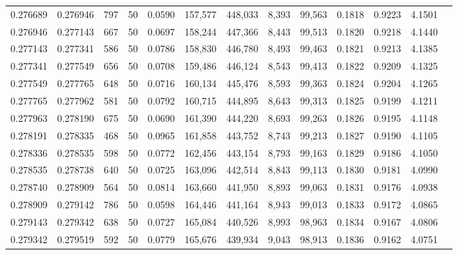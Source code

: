 \begin{tabular}{rrrrrrrrrrrrr}
0.276689 & 0.276946 &   797 &  50 &                                     0.0590 & 157,577 & 448,033 &   8,393 &  99,563 & 0.1818 & 0.9223 & 4.1501 \\
0.276946 & 0.277143 &   667 &  50 &                                     0.0697 & 158,244 & 447,366 &   8,443 &  99,513 & 0.1820 & 0.9218 & 4.1440 \\
0.277143 & 0.277341 &   586 &  50 &                                     0.0786 & 158,830 & 446,780 &   8,493 &  99,463 & 0.1821 & 0.9213 & 4.1385 \\
0.277341 & 0.277549 &   656 &  50 &                                     0.0708 & 159,486 & 446,124 &   8,543 &  99,413 & 0.1822 & 0.9209 & 4.1325 \\
0.277549 & 0.277765 &   648 &  50 &                                     0.0716 & 160,134 & 445,476 &   8,593 &  99,363 & 0.1824 & 0.9204 & 4.1265 \\
0.277765 & 0.277962 &   581 &  50 &                                     0.0792 & 160,715 & 444,895 &   8,643 &  99,313 & 0.1825 & 0.9199 & 4.1211 \\
0.277963 & 0.278190 &   675 &  50 &                                     0.0690 & 161,390 & 444,220 &   8,693 &  99,263 & 0.1826 & 0.9195 & 4.1148 \\
0.278191 & 0.278335 &   468 &  50 &                                     0.0965 & 161,858 & 443,752 &   8,743 &  99,213 & 0.1827 & 0.9190 & 4.1105 \\
0.278336 & 0.278535 &   598 &  50 &                                     0.0772 & 162,456 & 443,154 &   8,793 &  99,163 & 0.1829 & 0.9186 & 4.1050 \\
0.278535 & 0.278738 &   640 &  50 &                                     0.0725 & 163,096 & 442,514 &   8,843 &  99,113 & 0.1830 & 0.9181 & 4.0990 \\
0.278740 & 0.278909 &   564 &  50 &                                     0.0814 & 163,660 & 441,950 &   8,893 &  99,063 & 0.1831 & 0.9176 & 4.0938 \\
0.278909 & 0.279142 &   786 &  50 &                                     0.0598 & 164,446 & 441,164 &   8,943 &  99,013 & 0.1833 & 0.9172 & 4.0865 \\
0.279143 & 0.279342 &   638 &  50 &                                     0.0727 & 165,084 & 440,526 &   8,993 &  98,963 & 0.1834 & 0.9167 & 4.0806 \\
0.279342 & 0.279519 &   592 &  50 &                                     0.0779 & 165,676 & 439,934 &   9,043 &  98,913 & 0.1836 & 0.9162 & 4.0751 \\

\end{tabular}
